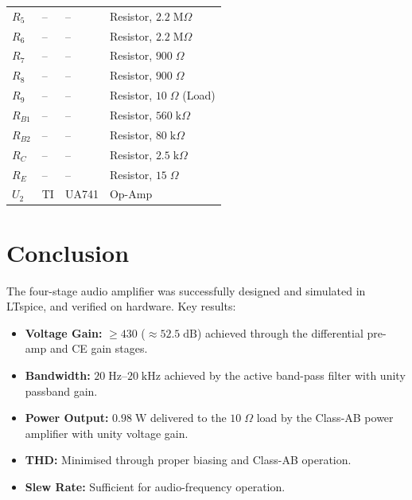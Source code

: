 \documentclass[10pt,twocolumn]{article}
\begin{document}
\begin{table}[H]
\begin{tabularx}{\linewidth}{l l l X}
$R_5$   & --      & --       & Resistor, $2.2\;\text{M}\Omega$ \\
$R_6$   & --      & --       & Resistor, $2.2\;\text{M}\Omega$ \\
$R_7$   & --      & --       & Resistor, $900\;\Omega$ \\
$R_8$   & --      & --       & Resistor, $900\;\Omega$ \\
$R_9$   & --      & --       & Resistor, $10\;\Omega$ (Load) \\
$R_{B1}$& --      & --       & Resistor, $560\;\text{k}\Omega$ \\
$R_{B2}$& --      & --       & Resistor, $80\;\text{k}\Omega$ \\
$R_C$   & --      & --       & Resistor, $2.5\;\text{k}\Omega$ \\
$R_E$   & --      & --       & Resistor, $15\;\Omega$ \\
$U_2$   & TI      & UA741    & Op-Amp \\
\bottomrule
\end{tabularx}
\end{table}

\section{Conclusion}

The four-stage audio amplifier was successfully designed and simulated in LTspice, and verified on hardware. Key results:
\begin{itemize}[nosep]
    \item \textbf{Voltage Gain:} $\geq 430$ ($\approx 52.5\;\text{dB}$) achieved through the differential pre-amp and CE gain stages.
    \item \textbf{Bandwidth:} $20\;\text{Hz}$--$20\;\text{kHz}$ achieved by the active band-pass filter with unity passband gain.
    \item \textbf{Power Output:} $0.98\;\text{W}$ delivered to the $10\;\Omega$ load by the Class-AB power amplifier with unity voltage gain.
    \item \textbf{THD:} Minimised through proper biasing and Class-AB operation.
    \item \textbf{Slew Rate:} Sufficient for audio-frequency operation.
\end{itemize}
\end{document}
